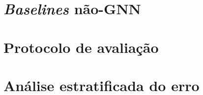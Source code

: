 \section{\emph{Baselines} n\~ao-GNN}
\label{sec:baselines}


\section{Protocolo de avalia\c{c}\~ao}
\label{sec:protocolo}


\section{An\'alise estratificada do erro}
\label{sec:metod_estratificacao}



